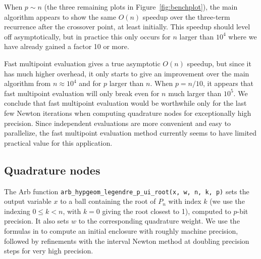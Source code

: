 \documentclass[11pt,a4paper]{article}
\begin{document}
When $p \sim n$ (the three remaining plots in Figure~\ref{fig:benchplot}), the main algorithm
appears to show the same $O(n)$ speedup
over the three-term recurrence after the crossover point, at least initially.
This speedup should level off asymptotically, but
in practice this only occurs for $n$ larger than $10^4$
where we have already gained a factor 10 or more.

Fast multipoint evaluation gives a true asymptotic $O(n)$ speedup,
but since it has much higher overhead,
it only starts to give an improvement over
the main algorithm from $n \approx 10^4$
and for $p$ larger than $n$.
When $p = n / 10$, it appears that
fast multipoint evaluation will only break even for $n$ much larger than $10^5$.
We conclude that fast multipoint evaluation would be
worthwhile only for the last few Newton iterations
when computing quadrature nodes for exceptionally high precision.
Since independent evaluations are more convenient and easy to parallelize,
the fast multipoint evaluation method
currently seems to have limited practical value for this application.

\subsection{Quadrature nodes}

The Arb function \texttt{arb\_hypgeom\_legendre\_p\_ui\_root(x, w, n, k, p)}
sets the output variable
$x$ to a ball containing the root of $P_n$ with index $k$ (we use the indexing
$0 \le k < n$, with $k = 0$ giving the root closest to 1),
computed to $p$-bit precision.
It also sets $w$ to the corresponding quadrature weight.
We use the formulas in \cite{petras1999computation} to
compute an initial enclosure with roughly machine precision,
followed by refinements with the interval Newton method
at doubling precision steps for very high precision.
\end{document}
